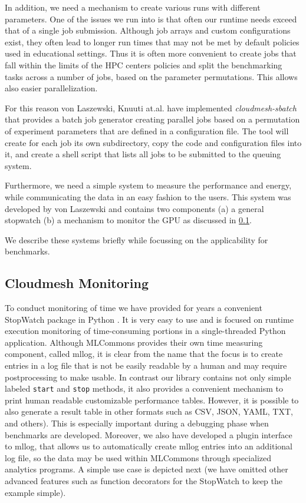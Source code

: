 \documentclass[utf8]{FrontiersinVancouver} %
\begin{document}
In addition, we need a mechanism to create various runs with different
parameters. One of the issues we run into is that often our runtime
needs exceed that of a single job submission. Although job arrays and
custom configurations exist, they often lead to longer run times that
may not be met by default policies used in educational settings. Thus
it is often more convenient to create jobs that fall within the limits
of the HPC centers policies and split the benchmarking tasks across a
number of jobs, based on the parameter permutations. This allows also
easier parallelization.

For this reason von Laszewski, Knuuti at.al. have implemented {\it
  cloudmesh-sbatch} that provides a batch job generator creating
parallel jobs based on a permutation of experiment parameters that are
defined in a configuration file. The tool will create for each job its
own subdirectory, copy the code and configuration files into it, and
create a shell script that lists all jobs to be submitted to the
queuing system.

Furthermore, we need a simple system to measure the performance and
energy, while communicating the data in an easy fashion to the
users. This system was developed by von Laszewski and contains two
components (a) a general stopwatch (b) a mechanism to monitor the GPU
as discussed in \ref{sec:monitoring}.

We describe these systems briefly while focussing on the applicability
for benchmarks.

\subsection{Cloudmesh Monitoring}
\label{sec:monitoring}

To conduct monitoring of time we have provided for years a convenient
StopWatch package in Python \citep{cloudmesh-stopwatch}.  It is very
easy to use and is focused on runtime execution monitoring of
time-consuming portions in a single-threaded Python
application. Although MLCommons provides their own time measuring
component, called mllog, it is clear from the name that the focus is
to create entries in a log file that is not be easily readable by a
human and may require postprocessing to make usable. In contrast our
library contains not only simple labeled \verb|start| and \verb|stop|
methods, it also provides a convenient mechanism to print human
readable customizable performance tables. However, it is possible to
also generate a result table in other formats such as CSV, JSON, YAML,
TXT, and others).  This is especially important during a debugging
phase when benchmarks are developed. Moreover, we also have developed
a plugin interface to mllog, that allows us to automatically create
mllog entries into an additional log file, so the data may be used
within MLCommons through specialized analytics programs. A simple use
case is depicted next (we have omitted other advanced features such as
function decorators for the StopWatch to keep the example simple).
\end{document}
